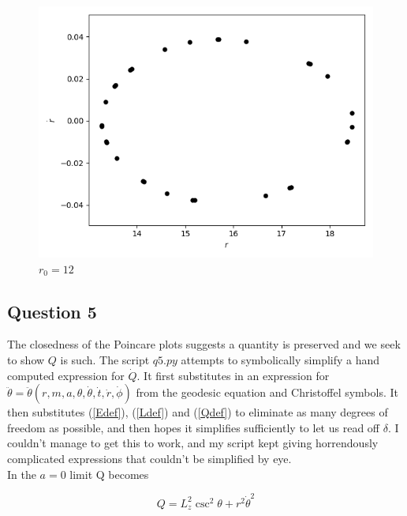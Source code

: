 \documentclass[10pt,a4paper]{report}
\begin{document}
\begin{figure}[!ht]
\begin{minipage}[b]{0.5\linewidth}
\centering
\includegraphics[width=\textwidth]{4/r0=12.png}
\caption{$r_0=12$}
\label{fig:figure1}
\end{minipage}
\end{figure}




\subsection*{Question 5}
The closedness of the Poincare plots suggests a quantity is preserved and we seek to show $Q$ is such. The script $q5.py$ attempts to symbolically simplify a hand computed expression for $\dot{Q}$. It first substitutes in an expression for $\ddot{\theta} = \ddot{\theta}(r,m,a,\theta,\dot{\theta}, \dot{t}, \dot{r},\dot{\phi})$ from the geodesic equation and Christoffel symbols. It then substitutes (\ref{Edef}), (\ref{Ldef}) and (\ref{Qdef}) to eliminate as many degrees of freedom as possible, and then hopes it simplifies sufficiently to let us read off $\delta$. I couldn't manage to get this to work, and my script kept giving horrendously complicated expressions that couldn't be simplified by eye.\\

In the $a=0$ limit Q becomes

\begin{equation*}
Q = L_z^2\csc^2{\theta} + r^2\dot{\theta}^2
\end{equation*}
\end{document}
